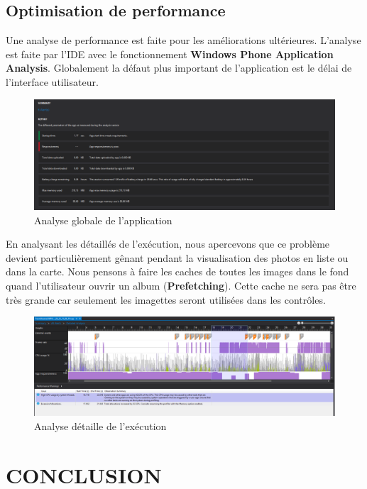 \documentclass{article}
\begin{document}
\subsection{\Large Optimisation de performance}
Une analyse de performance est faite pour les améliorations ultérieures. L'analyse est faite par l'IDE avec le fonctionnement  \textbf{Windows Phone Application Analysis}. Globalement la défaut plus important de l'application est le délai de l'interface utilisateur. 
\begin{figure}[h!]
\centering
\includegraphics[width=150mm]{ANALYSE1.png}
\caption{Analyse globale de l'application}
\end{figure}
En analysant les détaillés de l'exécution, nous apercevons que ce problème devient particulièrement gênant pendant la visualisation des photos en liste ou dans la carte. Nous pensons à faire les caches de toutes les images dans le fond quand l'utilisateur ouvrir un album (\textbf{Prefetching}). Cette cache ne sera pas être très grande car seulement les imagettes seront utilisées dans les contrôles. 
\begin{figure}[h!]
\centering
\includegraphics[width=150mm]{ANALYSE2.png}
\caption{Analyse détaille de l'exécution}
\end{figure}

\newpage
\section{\LARGE CONCLUSION }
\end{document}
